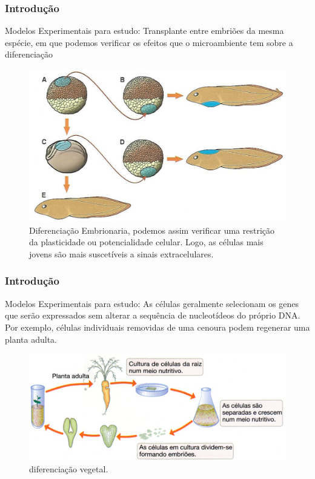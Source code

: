 \documentclass[brazil]{beamer}
\begin{document}
  \begin{frame}
    \frametitle{Introdução}
    \raggedright  
    \begin{block}{Modelos Experimentais para estudo:}
     Transplante entre embriões da mesma espécie, em que podemos verificar os efeitos que o microambiente tem sobre a diferenciação
    \end{block}

      \begin{figure}
	  \includegraphics[scale=0.15]{diferenciacao_embrionaria.png}
	  \caption{\tiny Diferenciação Embrionaria, podemos assim verificar uma restrição da plasticidade ou potencialidade celular. Logo, as células mais jovens são mais suscetíveis a sinais extracelulares.}
      \end{figure}
  \end{frame}
  
  \begin{frame}
    \frametitle{Introdução}
    \raggedright  
    \begin{block}{Modelos Experimentais para estudo:}
     As células geralmente selecionam os genes que serão expressados sem alterar a sequência de nucleotídeos do próprio DNA. Por exemplo, células individuais removidas de uma cenoura
    podem regenerar uma planta adulta.
    \end{block}
     
      \begin{figure}
	  \includegraphics[scale=0.5]{diferenciacao_vegetal.png}
	  \caption{\tiny diferenciação vegetal.}
      \end{figure}
  \end{frame}
\end{document}
